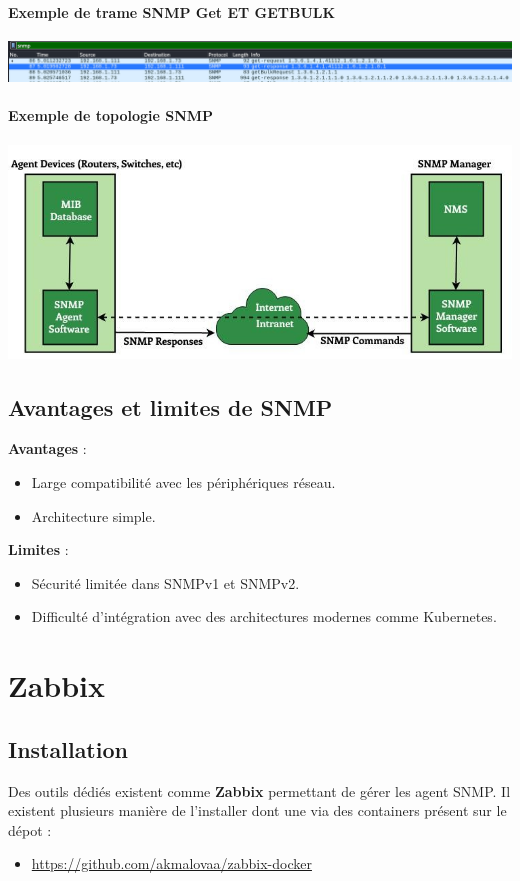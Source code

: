 \documentclass[french, 12pt]{article}%
\newcommand{\itemE}{\item[$\bullet$]}
\begin{document}
\paragraph{Exemple de trame SNMP Get ET GETBULK}
\begin{center}
\includegraphics[scale=0.7]{./ressource/exSnmpGet}
\end{center}


\paragraph{Exemple de topologie SNMP}
\begin{center}
\includegraphics[scale=0.7]{./ressource/SNMP_archi}
\end{center}


\subsection*{Avantages et limites de SNMP}
\textbf{Avantages} :
\begin{itemize}
    \itemE Large compatibilité avec les périphériques réseau.
    \itemE Architecture simple.
\end{itemize}
\textbf{Limites} :
\begin{itemize}
    \itemE Sécurité limitée dans SNMPv1 et SNMPv2.
    \itemE Difficulté d’intégration avec des architectures modernes comme Kubernetes.
\end{itemize}

\section{Zabbix}

\subsection{Installation}
Des outils dédiés existent comme \textbf{Zabbix} permettant de gérer les agent SNMP. Il existent plusieurs manière de l'installer dont une via des containers présent sur le dépot : 
\begin{itemize}
\itemE \href{https://github.com/akmalovaa/zabbix-docker}{https://github.com/akmalovaa/zabbix-docker}
\end{itemize}
\end{document}
